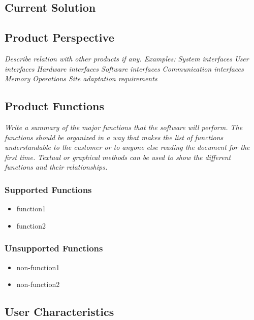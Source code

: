 \subsection{Current Solution}
\label{description:solution}


\subsection{Product Perspective}
\label{description:perspective}
\textit{
Describe relation with other products if any. Examples:
System interfaces
User interfaces
Hardware interfaces
Software interfaces
Communication interfaces
Memory
Operations
Site adaptation requirements}

\subsection{Product Functions}
\label{description:functions}
\textit{
Write a summary of the major functions that the software will perform. The functions should be organized in a way that makes the list of functions understandable to the customer or to anyone else reading the document for the first time. Textual or graphical methods can be used to show the different functions and their relationships.
}
	\subsubsection*{Supported Functions}
	\label{description:functions:supported}
	\begin{itemize}
		\item function1
		\item function2
	\end{itemize}

	\subsubsection*{Unsupported Functions}
	\label{description:functions:unsupported}
	\begin{itemize}
		\item non-function1
		\item non-function2
	\end{itemize}
	

\subsection{User Characteristics}
\label{description:usercharacteristics}


